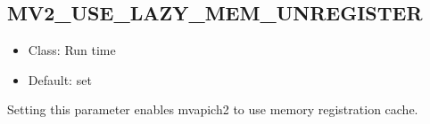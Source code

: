% 
% 
% 
% 

\subsection{MV2\_USE\_LAZY\_MEM\_UNREGISTER}
\begin{itemize}
    \item Class: Run time
    \item Default: set
\end{itemize}
Setting this parameter enables mvapich2 to use memory registration cache.



